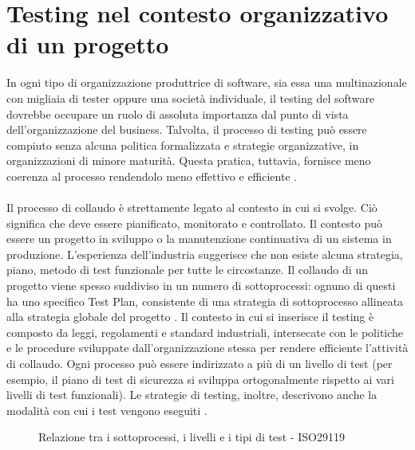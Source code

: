 \documentclass[../main.tex]{subfiles}
\begin{document}
\section{Testing nel contesto organizzativo di un progetto}
In ogni tipo di organizzazione produttrice di software, sia essa una multinazionale con migliaia di tester oppure una società individuale, il testing del software dovrebbe occupare un ruolo di assoluta importanza dal punto di vista dell'organizzazione del business.
Talvolta, il processo di testing può essere compiuto senza alcuna politica formalizzata e strategie organizzative, in organizzazioni di minore maturità. Questa pratica, tuttavia, fornisce meno coerenza al processo rendendolo meno effettivo e efficiente \cite{iso29119}.\paragraph{}
Il processo di collaudo è strettamente legato al contesto in cui si svolge. Ciò significa che deve essere pianificato, monitorato e controllato.
Il contesto può essere un progetto in sviluppo o la manutenzione continuativa di un sistema in produzione. L'esperienza dell'industria suggerisce che non esiste alcuna strategia, piano, metodo di test funzionale per tutte le circostanze.
Il collaudo di un progetto viene spesso suddiviso in un numero di sottoprocessi: ognuno di questi ha uno specifico Test Plan, consistente di una strategia di sottoprocesso allineata alla strategia globale del progetto \cite{iso29119}.
Il contesto in cui si inserisce il testing è composto da leggi, regolamenti e standard industriali, intersecate con le politiche e le procedure sviluppate dall'organizzazione stessa per rendere efficiente l'attività di collaudo.
Ogni processo può essere indirizzato a più di un livello di test (per esempio, il piano di test di sicurezza si sviluppa ortogonalmente rispetto ai vari livelli di test funzionali).
Le strategie di testing, inoltre, descrivono anche la modalità con cui i test vengono eseguiti \cite{iso29119}.
\begin{figure}[H]
\centering
{}
\caption{Relazione tra i sottoprocessi, i livelli e i tipi di test - ISO29119 \cite{iso29119}}\label{fig:3}
\end{figure}
\end{document}
